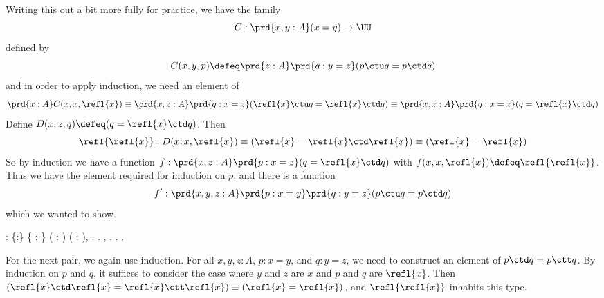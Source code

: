 Writing this out a bit more fully for practice, we have the family
\[
  C : \prd{x, y : A} (x = y) \to \UU
\]
defined by
\[
  C(x, y, p) \defeq 
  \prd{z:A}\prd{q:y=z}(p \ctu q = p \ctd q)
\] 
and in order to apply induction, we need an element of
\[
  \prd{x:A}C(x, x, \refl{x}) 
  \equiv
  \prd{x, z:A}\prd{q:x=z}(\refl{x} \ctu q = \refl{x} \ctd q)
  \equiv
  \prd{x, z:A}\prd{q:x=z}(q = \refl{x} \ctd q)
\]
Define $D(x, z, q) \defeq (q = \refl{x} \ctd q)$.  Then
\[
  \refl{\refl{x}} : 
  D(x, x, \refl{x}) 
  \equiv
  (\refl{x} = \refl{x} \ctd \refl{x})
  \equiv
  (\refl{x} = \refl{x})
\]
So by induction we have a function $f:\prd{x, z: A}\prd{p:x=z}(q = \refl{x}
\ctd q)$ with $f(x, x, \refl{x}) \defeq \refl{\refl{x}}$.  Thus we have the
element required for induction on $p$, and there is a function 
\[
  f' : \prd{x, y, z:A}\prd{p:x=y}\prd{q:y=z}(p \ctu q = p \ctd q)
\]
which we wanted to show.  \begin{coqdoccode}
\coqdocemptyline
\coqdocnoindent
{}  : \coqdockw{\ensuremath{\forall}} \{:\} \{   : \} ( :  \coqdocnotation{=} ) ( :  \coqdocnotation{=} ), \coqdoceol
\coqdocindent{1.00em}
\coqdocnotation{(}  \coqdocnotation{)} \coqdocnotation{=} \coqdocnotation{(}  \coqdocnotation{)}.\coqdoceol
\coqdocnoindent
{}.\coqdoceol
\coqdocindent{1.00em}
 , . .\coqdoceol
\coqdocnoindent
{}.\coqdoceol
\coqdocemptyline
\end{coqdoccode}
For the next pair, we again use induction.  For all $x, y, z : A$,
$p : x = y$, and $q : y = z$, we need to construct an element of $p
\ctd q = p \ctt q$.  By induction on $p$ and $q$, it suffices to consider the
case where $y$ and $z$ are $x$ and $p$ and $q$ are $\refl{x}$.  Then
$(\refl{x} \ctd \refl{x} = \refl{x} \ctt \refl{x}) \equiv (\refl{x} =
\refl{x})$, and $\refl{\refl{x}}$ inhabits this type.
